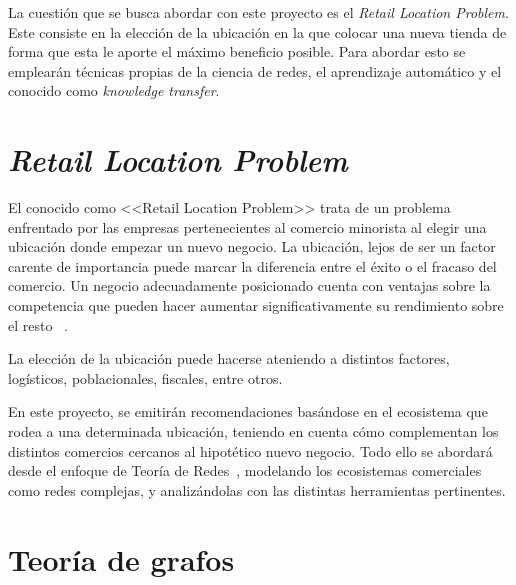 
La cuestión que se busca abordar con este proyecto es el \textit{Retail Location Problem}. Este consiste
en la elección de la ubicación en la que colocar una nueva tienda de forma que esta le aporte el máximo beneficio posible. Para abordar esto se emplearán técnicas propias de la ciencia de redes, el aprendizaje automático y el conocido como \textit{knowledge transfer}.

\section{\textit{Retail Location Problem}}

El conocido como <<Retail Location Problem>> trata de un problema enfrentado por las empresas pertenecientes al comercio minorista al elegir una ubicación donde empezar un nuevo negocio. La ubicación, lejos de ser un factor carente de importancia puede marcar la diferencia entre el éxito o el fracaso del comercio. Un negocio adecuadamente posicionado cuenta con ventajas sobre la competencia que pueden hacer aumentar significativamente su rendimiento sobre el resto ~\cite{Ahedo2021, RSVAJSSHJG}.

La elección de la ubicación puede hacerse ateniendo a distintos factores, logísticos, poblacionales, fiscales, entre otros.

 En este proyecto, se emitirán recomendaciones basándose en el ecosistema que rodea a una determinada ubicación, teniendo en cuenta cómo complementan los distintos comercios cercanos al hipotético nuevo negocio. Todo ello se abordará desde el enfoque de Teoría de Redes~\cite{eswiki:151888116}, modelando los ecosistemas comerciales como redes complejas, y analizándolas con las distintas herramientas pertinentes. 

%


\section{Teoría de grafos}

